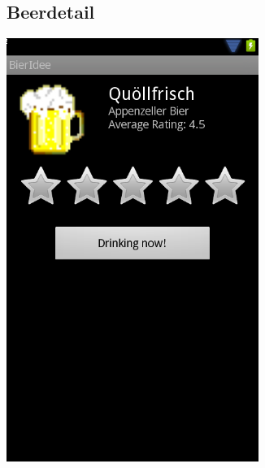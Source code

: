 \documentclass[10pt,a4paper]{scrartcl}
\begin{document}
\subsection{Beerdetail}
\includegraphics[scale=.4]{bierdetail-screen.png}
\end{document}
